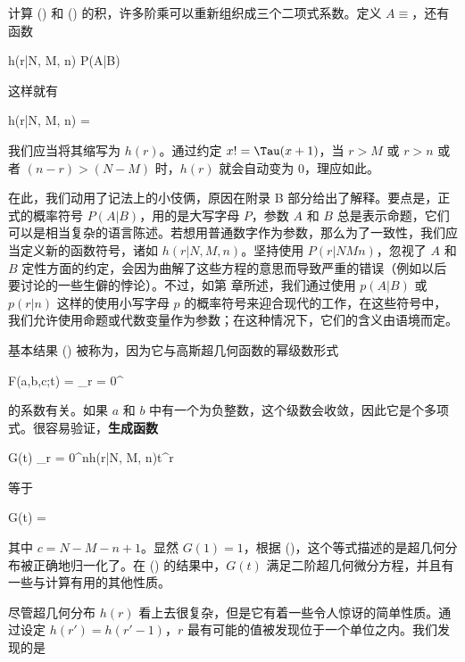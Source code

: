 计算 (\in[3-15]) 和 (\in[3-18]) 的积，许多阶乘可以重新组织成三个二项式系数。定义 $A\equiv$，还有函数

\placeformula[3-21]
\startformula
h(r|N, M, n) \equiv P(A|B)
\stopformula

这样就有

\placeformula[3-22]
\startformula
h(r|N, M, n) = 
\stopformula

我们应当将其缩写为 $h(r)$。通过约定 $x! = \Tau(x + 1)$，当 $r > M$ 或 $r > n$ 或者 $(n - r) > (N - M)$ 时，$h(r)$ 就会自动变为 $0$，理应如此。

在此，我们动用了记法上的小伎俩，原因在附录 B 部分给出了解释。要点是，正式的概率符号 $P(A|B)$，用的是大写字母 $P$，参数 $A$ 和 $B$ 总是表示命题，它们可以是相当复杂的语言陈述。若想用普通数字作为参数，那么为了一致性，我们应当定义新的函数符号，诸如 $h(r|N, M, n)$。坚持使用 $P(r|NMn)$，忽视了 $A$ 和 $B$ 定性方面的约定，会因为曲解了这些方程的意思而导致严重的错误（例如以后要讨论的一些生僻的悖论）。不过，如第  章所述，我们通过使用 $p(A|B)$ 或 $p(r|n)$ 这样的使用小写字母 $p$ 的概率符号来迎合现代的工作，在这些符号中，我们允许使用命题或代数变量作为参数；在这种情况下，它们的含义由语境而定。

基本结果 (\in[3-22]) 被称为，因为它与高斯超几何函数的幂级数形式

\placeformula[3-23]
\startformula
F(a,b,c;t) = \sum_{r = 0}^{\infty}
\stopformula

的系数有关。如果 $a$ 和 $b$ 中有一个为负整数，这个级数会收敛，因此它是个多项式。很容易验证，{\bf 生成函数}

\placeformula[3-24]
\startformula
G(t) \equiv \sum_{r = 0}^nh(r|N, M, n)t^r
\stopformula

等于

\placeformula[3-25]
\startformula
G(t) = 
\stopformula

其中 $c = N - M - n + 1$。显然 $G(1) = 1$，根据 (\in[3-24])，这个等式描述的是超几何分布被正确地归一化了。在 (\in[3-25]) 的结果中，$G(t)$ 满足二阶超几何微分方程，并且有一些与计算有用的其他性质。

尽管超几何分布 $h(r)$ 看上去很复杂，但是它有着一些令人惊讶的简单性质。通过设定 $h(r') = h(r' - 1)$，$r$ 最有可能的值被发现位于一个单位之内。我们发现的是


